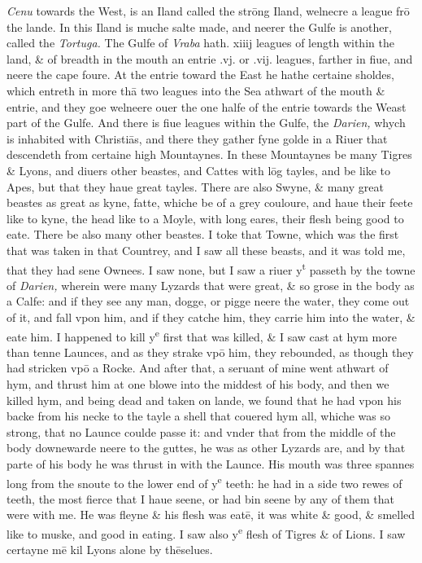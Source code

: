 \documentclass[11pt,twoside]{article}\makeatletter
\begin{document}
	\normalmarginpar
       {\itshape Cenu} towards the West, is an Iland called the strōng Iland, welnecre a league frō the lande. In this Iland is muche salte made, and neerer the Gulfe is another, called the {\itshape Tortuga.} The Gulfe of {\itshape Vraba} hath. xiiij leagues of length within the land, \& 
	\normalmarginpar
       of breadth in the mouth an entrie .vj. or .vij. leagues, farther in fiue, and neere the cape foure. At the entrie toward the East he hathe certaine sholdes, which entreth in more thā two leagues into the Sea athwart of the mouth \& entrie, and they goe wel­neere ouer the one halfe of the entrie towards the Weast part of the Gulfe. And there is fiue leagues within the Gulfe, the {\itshape Darien,} whych is inhabited with Christiās, and there they ga­ther fyne golde in a Riuer that descendeth from certaine high Mountaynes. In these Mountaynes be many Tigres \& Ly­ons, and diuers other beastes, and Cattes with lōg tayles, and %
 be like to Apes, but that they haue great tayles. There are also Swyne, \& many great beastes as great as kyne, fatte, whiche be of a grey couloure, and haue their feete like to kyne, the head like to a Moyle, with long eares, their flesh being good to eate. There be also many other beastes. I toke that Towne, which was the first that was taken in that Countrey, and I saw all these beasts, and it was told me, that they had sene Ownees. I saw none, but I saw a riuer y\textsuperscript{t} passeth by the towne of {\itshape Darien,} wherein were many Lyzards that were great, \& so grose in the body as a Calfe: and if they see any man, dogge, or pigge neere the water, they come out of it, and fall vpon him, and if they catche him, they carrie him into the water, \& eate him. I hap­pened to kill y\textsuperscript{e} first that was killed, \& I saw cast at hym more than tenne Launces, and as they strake vpō him, they reboun­ded, as though they had stricken vpō a Rocke. And after that, a seruant of mine went athwart of hym, and thrust him at one blowe into the middest of his body, and then we killed hym, and being dead and taken on lande, we found that he had vpon his backe from his necke to the tayle a shell that couered hym all, whiche was so strong, that no Launce coulde passe it: and vnder that from the middle of the body downewarde neere to the guttes, he was as other Lyzards are, and by that parte of his body he was thrust in with the Launce. His mouth was three spannes long from the snoute to the lower end of y\textsuperscript{e} teeth: he had in a side two rewes of teeth, the most fierce that I haue seene, or had bin seene by any of them that were with me. He was fleyne \& his flesh was eatē, it was white \& good, \& smelled like to muske, and good in eating. I saw also y\textsuperscript{e} flesh of Tigres \& of Lions. I saw certayne mē kil Lyons alone by thēselues. 
\end{document}

